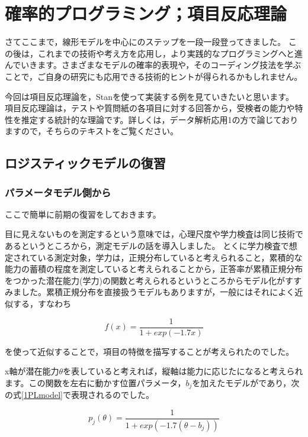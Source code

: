 \documentclass{ltjsbook}
\begin{document}
\chapter{確率的プログラミング；項目反応理論}
\label{x27_IRTonBayes}
さてここまで，線形モデルを中心にのステップを一段一段登ってきました。
この後は，これまでの技術や考え方を応用し，より実践的なプログラミングへと進んでいきます。さまざまなモデルの確率的表現や，そのコーディング技法を学ぶことで，ご自身の研究にも応用できる技術的ヒントが得られるかもしれません。

今回は項目反応理論を，Stanを使って実装する例を見ていきたいと思います。
項目反応理論は，テストや質問紙の各項目に対する回答から，受検者の能力や特性を推定する統計的な理論です。詳しくは，データ解析応用1の方で論じておりますので，そちらのテキストをご覧ください。
\section{ロジスティックモデルの復習}
\subsection{パラメータモデル側から}
ここで簡単に前期の復習をしておきます。

目に見えないものを測定するという意味では，心理尺度や学力検査は同じ技術であるというところから，測定モデルの話を導入しました。
とくに学力検査で想定されている測定対象，学力は，正規分布していると考えられること，累積的な能力の蓄積の程度を測定していると考えられることから，正答率が累積正規分布をつかった潜在能力(学力)の関数と考えられるというところからモデル化がすすみました。累積正規分布を直接扱うモデルもありますが，一般にはそれによく近似する，すなわち

\[ f(x) = \frac{1}{1+exp(-1.7x)}\]

を使って近似することで，項目の特徴を描写することが考えられたのでした。

x軸が潜在能力$\theta$を表していると考えれば，縦軸は能力に応じたになると考えられます。この関数を左右に動かす位置パラメータ，$b_j$を加えたモデルがであり，次の式\ref{1PLmodel}で表現されるのでした。

\begin{equation}
	p_j(\theta) = \frac{1}{1+exp(-1.7(\theta-b_j))}
	\label{1PLmodel}
\end{equation}
\end{document}

